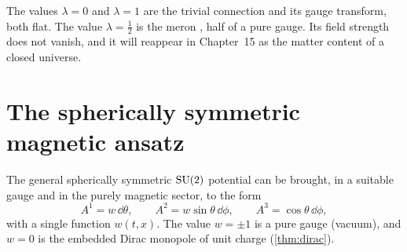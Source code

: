 The values $\lambda=0$ and $\lambda=1$ are the trivial connection and its gauge transform, both flat. The value $\lambda=\frac12$ is the meron \cite{deAlfaroFubiniFurlan1976}, half of a pure gauge. Its field strength does not vanish, and it will reappear in Chapter~15 as the matter content of a closed universe.

\section{The spherically symmetric magnetic ansatz}

The general spherically symmetric $\mathrm{SU}(2)$ potential can be brought, in a suitable gauge and in the purely magnetic sector, to the form \cite{Witten1977,BartnikMcKinnon1988}
\begin{equation}\label{eq:magansatz}
A^1=w\,\dd\theta,\qquad A^2=w\sin\theta\,\dd\phi,\qquad A^3=\cos\theta\,\dd\phi,
\end{equation}
with a single function $w(t,x)$. The value $w=\pm1$ is a pure gauge (vacuum), and $w=0$ is the embedded Dirac monopole of unit charge (\cref{thm:dirac}).

